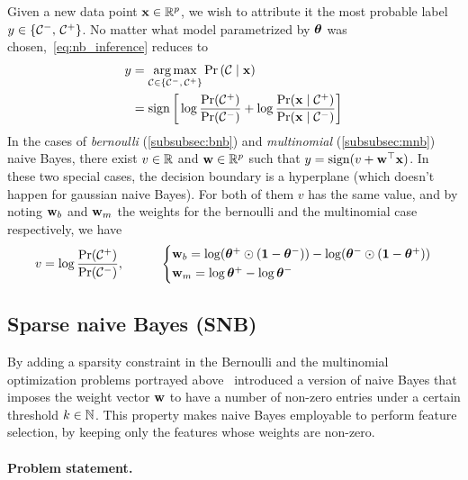 Given a new data point $\mathbf{x} \in \mathbb{R}^p$, we wish to attribute it the most probable label
$y \in \left\{ \mathcal{C}^-,\, \mathcal{C}^+ \right\}$.
No matter what model parametrized by $\bm{\theta}$ was chosen,~\ref{eq:nb_inference} reduces to
\begin{align*}
    y &= \underset{\mathcal{C} \in \left\{ \mathcal{C}^-,\, \mathcal{C}^+ \right\}}{\operatorname*{arg\,max}} \Pr\left( \mathcal{C} \mid \mathbf{x} \right)\\
    &= \operatorname*{sign}\bigg[\log \frac{\Pr(\mathcal{C}^+)}{\Pr(\mathcal{C}^-)}
        + \log \frac{\Pr(\mathbf{x} \mid \mathcal{C}^+)}{\Pr(\mathbf{x} \mid \mathcal{C}^-)}\bigg]
\end{align*}
In the cases of \emph{bernoulli} (\ref{subsubsec:bnb}) and \emph{multinomial} (\ref{subsubsec:mnb}) naive Bayes,
there exist $v \in \mathbb{R}$ and $\mathbf{w} \in \mathbb{R}^p$ such that $y = \operatorname*{sign}(v + \mathbf{w}^\top\mathbf{x})$.
In these two special cases, the decision boundary is a hyperplane (which doesn't happen for gaussian naive Bayes).
For both of them $v$ has the same value, and by noting $\mathbf{w}_b$ and $\mathbf{w}_m$ the weights for the bernoulli
and the multinomial case respectively, we have
\begin{equation*}
    v = \log\frac{\Pr(\cC^+)}{\Pr(\cC^-)}
    ,\qquad\quad
    \begin{cases*}
        \ww_b = \log(\btheta^+\odot(\1 - \btheta^-)) - \log(\btheta^-\odot(\1 - \btheta^+))\\
        \ww_m = \log\btheta^+ - \log\btheta^-
    \end{cases*}
\end{equation*}

\subsection{Sparse naive Bayes (SNB)}\label{subsec:snb}

By adding a sparsity constraint in the Bernoulli
and the multinomial optimization problems portrayed above~\cite{sparse_naive_bayes}
introduced a version of naive Bayes that imposes the weight vector $\mathbf{w}$
to have a number of non-zero entries under a certain threshold $k \in \mathbb{N}$.
This property makes naive Bayes employable to perform feature selection,
by keeping only the features whose weights are non-zero.

\paragraph{Problem statement.}\label{subsubsec:snb_ps}

